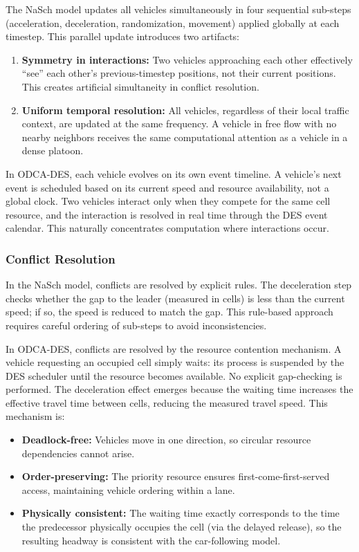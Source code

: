 \documentclass[review,authoryear]{elsarticle}
\begin{document}
The NaSch model updates all vehicles simultaneously in four sequential sub-steps (acceleration, deceleration, randomization, movement) applied globally at each timestep. This parallel update introduces two artifacts:
\begin{enumerate}
    \item \textbf{Symmetry in interactions:} Two vehicles approaching each other effectively ``see'' each other's previous-timestep positions, not their current positions. This creates artificial simultaneity in conflict resolution.
    \item \textbf{Uniform temporal resolution:} All vehicles, regardless of their local traffic context, are updated at the same frequency. A vehicle in free flow with no nearby neighbors receives the same computational attention as a vehicle in a dense platoon.
\end{enumerate}

In ODCA-DES, each vehicle evolves on its own event timeline. A vehicle's next event is scheduled based on its current speed and resource availability, not a global clock. Two vehicles interact only when they compete for the same cell resource, and the interaction is resolved in real time through the DES event calendar. This naturally concentrates computation where interactions occur.

\subsubsection{Conflict Resolution}

In the NaSch model, conflicts are resolved by explicit rules. The deceleration step checks whether the gap to the leader (measured in cells) is less than the current speed; if so, the speed is reduced to match the gap. This rule-based approach requires careful ordering of sub-steps to avoid inconsistencies.

In ODCA-DES, conflicts are resolved by the resource contention mechanism. A vehicle requesting an occupied cell simply waits: its process is suspended by the DES scheduler until the resource becomes available. No explicit gap-checking is performed. The deceleration effect emerges because the waiting time increases the effective travel time between cells, reducing the measured travel speed. This mechanism is:
\begin{itemize}
    \item \textbf{Deadlock-free:} Vehicles move in one direction, so circular resource dependencies cannot arise.
    \item \textbf{Order-preserving:} The priority resource ensures first-come-first-served access, maintaining vehicle ordering within a lane.
    \item \textbf{Physically consistent:} The waiting time exactly corresponds to the time the predecessor physically occupies the cell (via the delayed release), so the resulting headway is consistent with the car-following model.
\end{itemize}
\end{document}
